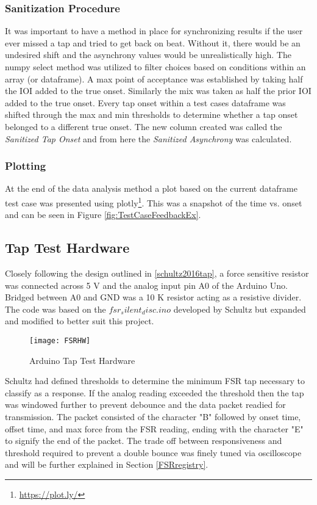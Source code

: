 \subsubsection{Sanitization Procedure}\label{sanitizationProcedure}
It was important to have a method in place for synchronizing results if the user ever missed a tap and tried to get back on beat. Without it, there would be an undesired shift and the asynchrony values would be unrealistically high. The numpy select method was utilized to filter choices based on conditions within an array (or dataframe). A max point of acceptance was established by taking half the IOI added to the true onset. Similarly the mix was taken as half the prior IOI added to the true onset. Every tap onset within a test cases dataframe was shifted through the max and min thresholds to determine whether a tap onset belonged to a different true onset. The new column created was called the \textit{Sanitized Tap Onset} and from here the \textit{Sanitized Asynchrony} was calculated.
\subsubsection{Plotting}
At the end of the data analysis method a plot based on the current dataframe test case was presented using plotly\footnote{\url{https://plot.ly/}}. This was a snapshot of the time vs. onset and can be seen in Figure \ref{fig:TestCaseFeedbackEx}.
\subsection{Tap Test Hardware} \label{tap_arduino}
Closely following the design outlined in \ref{schultz2016tap}, a force sensitive resistor was connected across 5 V and the analog input pin A0 of the Arduino Uno. Bridged between A0 and GND was a 10 K resistor acting as a resistive divider. The code was based on the \textit{$fsr_silent_disc.ino$} developed by Schultz but expanded and modified to better suit this project. 

\begin{figure}[H]
    \centering
    \texttt{[image: FSRHW]}
    \caption{Arduino Tap Test Hardware}
\end{figure}

Schultz had defined thresholds to determine the minimum FSR tap necessary to classify as a response. If the analog reading exceeded the threshold then the tap was windowed further to prevent debounce and the data packet readied for transmission. The packet consisted of the character "B" followed by onset time, offset time, and max force from the FSR reading, ending with the character "E" to signify the end of the packet. The trade off between responsiveness and threshold required to prevent a double bounce was finely tuned via oscilloscope and will be further explained in Section \ref{FSRregistry}.


